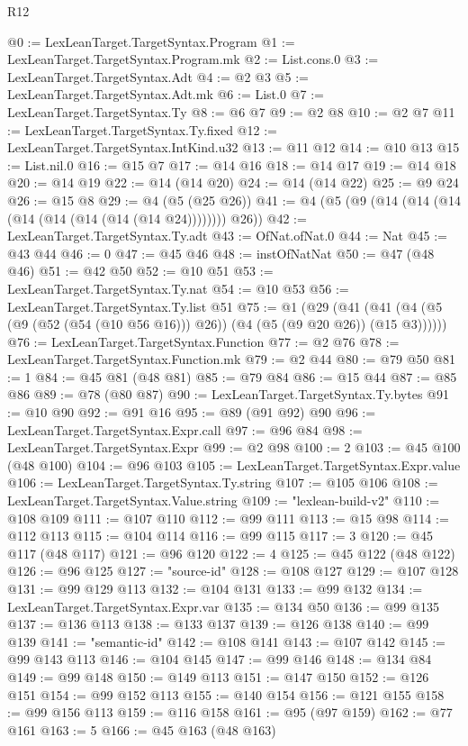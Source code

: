 \begin{lexlean}{R12}
\begin{coremodule}
@0 := LexLeanTarget.TargetSyntax.Program
@1 := LexLeanTarget.TargetSyntax.Program.mk
@2 := List.cons.{0}
@3 := LexLeanTarget.TargetSyntax.Adt
@4 := @2 @3
@5 := LexLeanTarget.TargetSyntax.Adt.mk
@6 := List.{0}
@7 := LexLeanTarget.TargetSyntax.Ty
@8 := @6 @7
@9 := @2 @8
@10 := @2 @7
@11 := LexLeanTarget.TargetSyntax.Ty.fixed
@12 := LexLeanTarget.TargetSyntax.IntKind.u32
@13 := @11 @12
@14 := @10 @13
@15 := List.nil.{0}
@16 := @15 @7
@17 := @14 @16
@18 := @14 @17
@19 := @14 @18
@20 := @14 @19
@22 := @14 (@14 @20)
@24 := @14 (@14 @22)
@25 := @9 @24
@26 := @15 @8
@29 := @4 (@5 (@25 @26))
@41 := @4 (@5 (@9 (@14 (@14 (@14 (@14 (@14 (@14 (@14 (@14 @24)))))))) @26))
@42 := LexLeanTarget.TargetSyntax.Ty.adt
@43 := OfNat.ofNat.{0}
@44 := Nat
@45 := @43 @44
@46 := 0
@47 := @45 @46
@48 := instOfNatNat
@50 := @47 (@48 @46)
@51 := @42 @50
@52 := @10 @51
@53 := LexLeanTarget.TargetSyntax.Ty.nat
@54 := @10 @53
@56 := LexLeanTarget.TargetSyntax.Ty.list @51
@75 := @1
    (@29 (@41 (@41 (@4 (@5 (@9 (@52 (@54 (@10 @56 @16))) @26)) (@4 (@5 (@9 @20 @26)) (@15 @3))))))
@76 := LexLeanTarget.TargetSyntax.Function
@77 := @2 @76
@78 := LexLeanTarget.TargetSyntax.Function.mk
@79 := @2 @44
@80 := @79 @50
@81 := 1
@84 := @45 @81 (@48 @81)
@85 := @79 @84
@86 := @15 @44
@87 := @85 @86
@89 := @78 (@80 @87)
@90 := LexLeanTarget.TargetSyntax.Ty.bytes
@91 := @10 @90
@92 := @91 @16
@95 := @89 (@91 @92) @90
@96 := LexLeanTarget.TargetSyntax.Expr.call
@97 := @96 @84
@98 := LexLeanTarget.TargetSyntax.Expr
@99 := @2 @98
@100 := 2
@103 := @45 @100 (@48 @100)
@104 := @96 @103
@105 := LexLeanTarget.TargetSyntax.Expr.value
@106 := LexLeanTarget.TargetSyntax.Ty.string
@107 := @105 @106
@108 := LexLeanTarget.TargetSyntax.Value.string
@109 := "lexlean-build-v2"
@110 := @108 @109
@111 := @107 @110
@112 := @99 @111
@113 := @15 @98
@114 := @112 @113
@115 := @104 @114
@116 := @99 @115
@117 := 3
@120 := @45 @117 (@48 @117)
@121 := @96 @120
@122 := 4
@125 := @45 @122 (@48 @122)
@126 := @96 @125
@127 := "source-id"
@128 := @108 @127
@129 := @107 @128
@131 := @99 @129 @113
@132 := @104 @131
@133 := @99 @132
@134 := LexLeanTarget.TargetSyntax.Expr.var
@135 := @134 @50
@136 := @99 @135
@137 := @136 @113
@138 := @133 @137
@139 := @126 @138
@140 := @99 @139
@141 := "semantic-id"
@142 := @108 @141
@143 := @107 @142
@145 := @99 @143 @113
@146 := @104 @145
@147 := @99 @146
@148 := @134 @84
@149 := @99 @148
@150 := @149 @113
@151 := @147 @150
@152 := @126 @151
@154 := @99 @152 @113
@155 := @140 @154
@156 := @121 @155
@158 := @99 @156 @113
@159 := @116 @158
@161 := @95 (@97 @159)
@162 := @77 @161
@163 := 5
@166 := @45 @163 (@48 @163)

\end{coremodule}
\end{lexlean}
